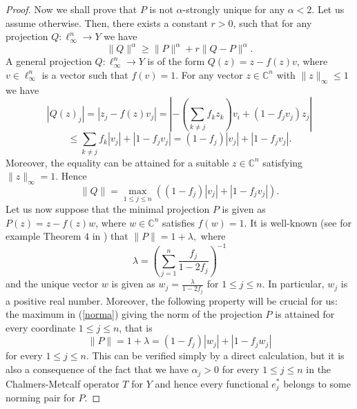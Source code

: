 \documentclass[12pt, reqno]{amsart}
\theoremstyle{definition}
\theoremstyle{remark}
\numberwithin{equation}{section}
\begin{document}
\begin{proof}
Now we shall prove that $P$ is not $\alpha$-strongly unique for any $\alpha < 2$. Let us assume otherwise. Then, there exists a constant $r>0$, such that for any projection $Q: \ell_{\infty}^n \to Y$ we have
\begin{equation}
\label{stala}
\|Q\|^{\alpha} \geq \|P\|^{\alpha} + r\|Q-P\|^{\alpha}.
\end{equation}
A general projection $Q:\ell_{\infty}^n \to Y$ is of the form $Q(z)=z-f(z)v$, where $v \in \ell_{\infty}^n$ is a vector such that $f(v)=1$. For any vector $z \in \mathbb{C}^n$ with $\|z\|_{\infty} \leq 1$ we have
$$|Q(z)_j| = |z_j-f(z)v_j| = \left | -\left ( \sum_{k \neq j} f_kz_k \right )v_i + (1-f_jv_j)z_j  \right |$$
$$\leq \sum_{k \neq j} f_k|v_j| + |1-f_jv_j| = (1-f_j)|v_j| + |1-f_jv_j|.$$
Moreover, the equality can be attained for a suitable $z \in \mathbb{C}^n$ satisfying $\|z\|_{\infty}=1$. Hence
\begin{equation}
\label{norma}
\|Q\| = \max_{1 \leq j \leq n} \left ( (1-f_j)|v_j| + |1-f_jv_j| \right ).
\end{equation}
Let us now suppose that the minimal projection $P$ is given as $P(z)=z-f(z)w$, where $w \in \mathbb{C}^n$ satisfies $f(w)=1$. It is well-known (see for example Theorem $4$ in \cite{skrzypekoperator}) that $\|P\| = 1 + \lambda,$ where 
$$\lambda =\left ( \sum_{j=1}^{n} \frac{f_j}{1-2f_j} \right )^{-1}$$
and the unique vector $w$ is given as $w_j=\frac{\lambda}{1-2f_j}$ for $1 \leq j \leq n$. In particular, $w_j$ is a positive real number. Moreover, the following property will be crucial for us: the maximum in (\ref{norma}) giving the norm of the projection $P$ is attained for every coordinate $1 \leq j \leq n$, that is
$$\|P\| = 1 + \lambda = (1-f_j)|w_j| + |1-f_jw_j|$$
for every $1 \leq j \leq n$. This can be verified simply by a direct calculation, but it is also a consequence of the fact that we have $\alpha_j>0$ for every $1 \leq j \leq n$ in the Chalmers-Metcalf operator $T$ for $Y$ and hence every functional $e_j^*$ belongs to some norming pair for $P$.


\end{proof}
\end{document}
